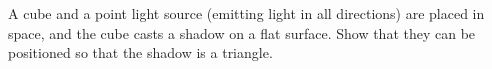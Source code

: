 A cube and a point light source (emitting light in all directions) are placed in space, and the cube casts a shadow on a flat surface. Show that they can be positioned so that the shadow is a triangle.
